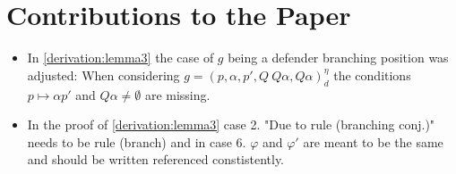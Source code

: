 \section{Contributions to the Paper}

\begin{itemize}
\item In \ref{derivation:lemma3} the case of $g$ being a defender branching position was adjusted: 
When considering $g=(p,\alpha ,p', Q \ Q \alpha, Q \alpha)_d^\eta$ the conditions $p \mapsto \alpha p'$ and $Q \alpha \neq \emptyset$ are 
missing. 
\item In the proof of \ref{derivation:lemma3} case 2. "Due to rule (branching conj.)" needs to be 
rule (branch) and in case 6. $\varphi $ and $\varphi '$ are meant to be the same and should be 
written referenced constistently.
\end{itemize}